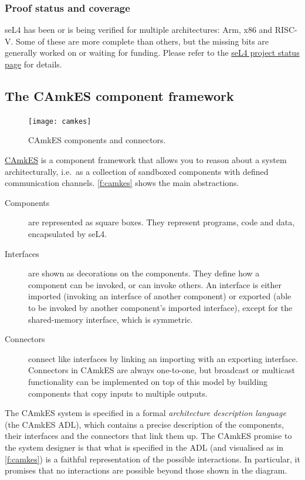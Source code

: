 \documentclass[english,a4paper,12pt\ifDraft,draft\fi]{report}
\newcommand{\SSect}[1]{\subsection{#1}}
\newcommand{\SSSect}[1]{\subsubsection*{#1}}
\newcommand{\SSect}[1]{\section{#1}}
\newcommand{\SSSect}[1]{\subsection*{#1}}
\begin{document}
  \SSSect{Proof status and coverage}

  seL4 has been or is being verified for multiple architectures: Arm,
  x86 and RISC-V. Some of these are more complete than others, but the
  missing bits are generally worked on or waiting for funding. Please
  refer to the
  \href{https://docs.sel4.systems/projects/sel4/status.html}{seL4
    project status page} for details.

  \SSect{The CAmkES component framework}\label{s:camkes}

  \begin{figure}[b]
    \centering
    \texttt{[image: camkes]}
    \caption{CAmkES components and connectors.}
    \label{f:camkes}
  \end{figure}

  \href{https://trustworthy.systems/projects/TS/camkes/trustcomp.pml}{CAmkES}
  is a component framework that allows you to reason about a
  system architecturally, i.e.\ as a collection of sandboxed
  components with defined communication channels. \autoref{f:camkes}
  shows the main abstractions.
  \begin{description}
  \item[Components] are represented as square boxes. They represent
     programs, code and data, encapsulated by seL4.
  \item[Interfaces] are shown as decorations on the components. They
    define how a component can be invoked, or can invoke others. An
    interface is either imported (invoking an interface of another
    component) or exported (able to be invoked by another component's
    imported interface), except for the shared-memory interface, which
    is symmetric.
  \item[Connectors] connect like interfaces by linking an importing with an
    exporting interface. Connectors in CAmkES are always one-to-one,
    but broadcast or multicast functionality can be implemented on top
    of this model by building components that copy inputs to multiple outputs.
  \end{description}

  The CAmkES system is specified in a formal \emph{architecture
    description language} (the CAmkES ADL), which contains a precise
  description of the components, their interfaces and the connectors
  that link them up. The CAmkES promise to the system designer is
  that what is specified in the ADL (and visualised as in
  \autoref{f:camkes}) is a faithful representation of the possible
  interactions. In particular, it promises that no interactions are
  possible beyond those shown in the diagram.
\end{document}
